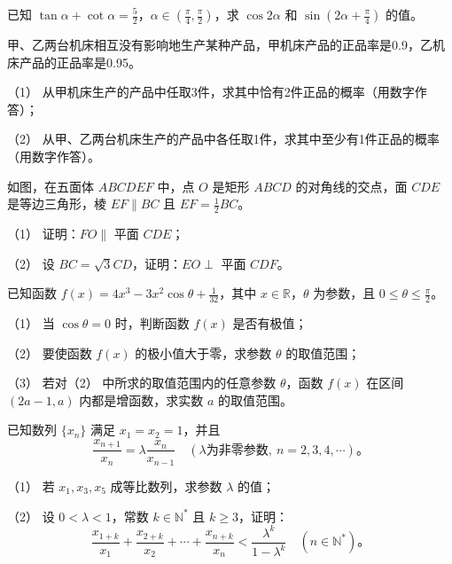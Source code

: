 \begin{question}
已知 $\tan\alpha+\cot\alpha=\frac52$，$\alpha\in(\frac\pi4,\frac\pi2)$，求 $\cos2\alpha$ 和 $\sin(2\alpha+\frac\pi4)$ 的值。

\end{question}
\begin{question}
甲、乙两台机床相互没有影响地生产某种产品，甲机床产品的正品率是0.9，乙机床产品的正品率是0.95。

（1） 从甲机床生产的产品中任取3件，求其中恰有2件正品的概率（用数字作答）；

（2） 从甲、乙两台机床生产的产品中各任取1件，求其中至少有1件正品的概率（用数字作答）。

\Needspace{0.4\textheight}
\end{question}
\begin{question}
如图，在五面体 $ABCDEF$ 中，点 $O$ 是矩形 $ABCD$ 的对角线的交点，面 $CDE$ 是等边三角形，棱 $EF\parallel BC$ 且 $EF=\frac12BC$。

（1） 证明：$FO\parallel$ 平面 $CDE$；

（2） 设 $BC=\sqrt3CD$，证明：$EO\perp$ 平面 $CDF$。
\nopagebreak[4]
\begin{center}\end{center}
\nopagebreak[4]
\end{question}
\begin{question}
已知函数 $f(x)=4x^3-3x^2\cos\theta+\frac1{32}$，其中 $x\in\mathbb R$，$\theta$ 为参数，且 $0\le\theta\le\frac\pi2$。

（1） 当 $\cos\theta=0$ 时，判断函数 $f(x)$ 是否有极值；

（2） 要使函数 $f(x)$ 的极小值大于零，求参数 $\theta$ 的取值范围；

（3） 若对（2） 中所求的取值范围内的任意参数 $\theta$，函数 $f(x)$ 在区间 $(2a-1,a)$ 内都是增函数，求实数 $a$ 的取值范围。

\end{question}
\begin{question}
已知数列 $\{x_n\}$ 满足 $x_1=x_2=1$，并且
\nopagebreak[4]
\[
\frac{x_{n+1}}{x_n}=\lambda\frac{x_n}{x_{n-1}}\quad(\lambda\text{为非零参数},\ n=2,3,4,\cdots)。
\]

（1） 若 $x_1,x_3,x_5$ 成等比数列，求参数 $\lambda$ 的值；

（2） 设 $0<\lambda<1$，常数 $k\in\mathbb N^*$ 且 $k\ge3$，证明：
\nopagebreak[4]
\[
\frac{x_{1+k}}{x_1}+\frac{x_{2+k}}{x_2}+\cdots+\frac{x_{n+k}}{x_n}<\frac{\lambda^k}{1-\lambda^k}\quad(n\in\mathbb N^*)。
\]

\Needspace{0.4\textheight}
\end{question}
